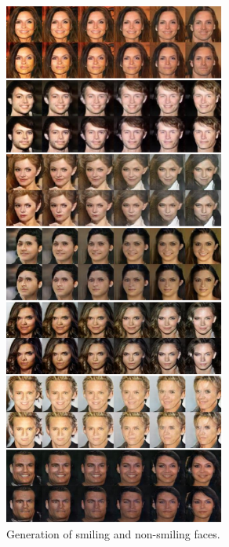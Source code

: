 \begin{figure}[thb!]
\centering
\includegraphics[trim=0in 0in 0in 0in, width=0.65\textwidth]{result_face_smiling_big1.pdf}
\caption{Generation of smiling and non-smiling faces.}
\label{fig::result_smiling1}
\end{figure}
